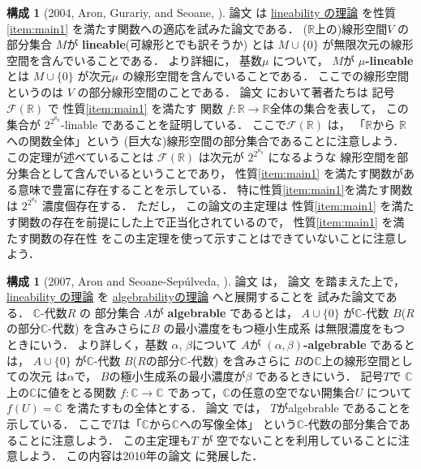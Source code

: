 \documentclass[leqno, a4paper, 12pt]{jsarticle}
\theoremstyle{definition}
\newtheorem{con}[thm]{構成}
\newcommand{\rr}{\mathbb{R}}
\newcommand{\cc}{\mathbb{C}}
\newcommand{\mycoco}{2^{2^{\aleph_{0}}}}
\begin{document}
\begin{con}[2004, Aron, Gurariy, and Seoane, \cite{MR2113929}]\label{con:ags}
論文
\cite{MR2113929}
は
\underline{lineability
の理論}
を性質
\ref{item:main1}
を満たす関数への適応を試みた論文である．
($\rr$上の)線形空間$V$
の部分集合
$M$が
\textbf{lineable}(可線形とでも訳そうか)
とは
$M\cup\{0\}$
が無限次元の線形空間を含んでいることである．
より詳細に，
基数$\mu$
について，
$M$が
\textbf{$\mu$-lineable}
とは
$M\cup \{0\}$
が次元$\mu$
の線形空間を含んでいることである．
ここでの線形空間というのは
$V$
の部分線形空間のことである．
論文
\cite{MR2113929}
において著者たちは
記号
$\mathcal{F}(\rr)$
で
性質\ref{item:main1}
を満たす
関数
$f\colon \rr\to \rr$全体の集合を表して，
この集合が
$\mycoco$-linable
であることを証明している．
ここで$\mathcal{F}(\rr)$
は，
「$\rr$から
$\rr$への関数全体」という
(巨大な)線形空間の部分集合であることに注意しよう．
この定理が述べていることは
$\mathcal{F}(\rr)$
は次元が
$\mycoco$
になるような
線形空間を部分集合として含んでいるということであり，
性質\ref{item:main1}
を満たす関数がある意味で豊富に存在することを示している．
特に性質\ref{item:main1}を満たす関数は
$\mycoco$
濃度個存在する．
ただし，
この論文の主定理は
性質\ref{item:main1}
を満たす関数の存在を前提にした上で正当化されているので，
性質\ref{item:main1}
を満たす関数の存在性
をこの主定理を使って示すことはできていないことに注意しよう．
\end{con}

\begin{con}[2007, Aron and Seoane-Sep\'{u}lveda, 
\cite{MR2327324}]\label{con:asese}
論文
\cite{MR2327324}
は，
論文
\cite{MR2113929}
を踏まえた上で，
\underline{lineability
の理論}
を
\underline{algebrabilityの理論}
へと展開することを
試みた論文である．
$\cc$-代数$R$
の
部分集合
$A$が
\textbf{algebrable}
であるとは，
$A\cup \{0\}$
が$\cc$-代数
$B$($R$の部分$\cc$-代数)
を含みさらに$B$
の最小濃度をもつ極小生成系
は無限濃度をもつときにいう．
より詳しく，基数
$\alpha$, $\beta$について
$A$が
\textbf{$(\alpha, \beta)$-algebrable}
であるとは，
$A\cup \{0\}$
が$\cc$-代数
$B$($R$の部分$\cc$-代数)
を含みさらに
$B$の$\cc$上の線形空間としての次元
は$\alpha$で，
$B$の極小生成系の最小濃度が$\beta$
であるときにいう．
記号$T$で
$\cc$上の$\cc$に値をとる関数
$f\colon\cc\to \cc$
であって，$\cc$の任意の空でない開集合$U$
について
$f(U)=\cc$
を満たすもの全体とする．
論文
\cite{MR2327324}
では，
$T$がalgebrable
であることを示している．
ここで$T$は「$\cc$から$\cc$への写像全体」
という$\cc$-代数の部分集合であることに注意しよう．
この主定理も$T$
が
空でないことを利用していることに注意しよう．
この内容は2010年の論文
\cite{MR2731374}
に発展した．
\end{con}
\end{document}
